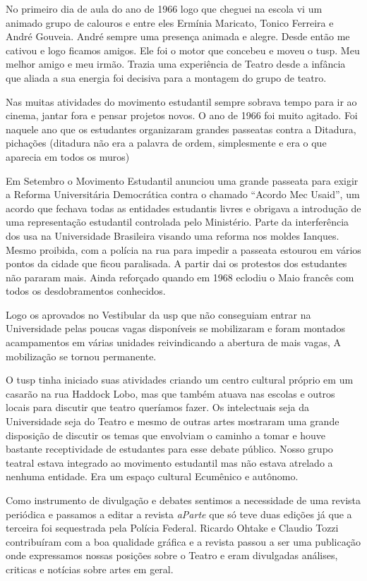 No primeiro dia de aula do ano de 1966 logo que cheguei na escola vi um
animado grupo de calouros e entre eles Ermínia Maricato, Tonico Ferreira
e André Gouveia. André sempre uma presença animada e alegre. Desde então
me cativou e logo ficamos amigos. Ele foi o motor que concebeu e moveu o
{\sc tusp}. Meu melhor amigo e meu irmão. Trazia uma experiência de Teatro
desde a infância que aliada a sua energia foi decisiva para a montagem
do grupo de teatro.

Nas muitas atividades do movimento estudantil sempre sobrava tempo para
ir ao cinema, jantar fora e pensar projetos novos. O ano de 1966 foi
muito agitado. Foi naquele ano que os estudantes organizaram grandes
passeatas contra a Ditadura, pichações ({\sc ditadura não} era a palavra de
ordem, simplesmente e era o que aparecia em todos os muros)

Em Setembro o Movimento Estudantil anunciou uma grande passeata para
exigir a Reforma Universitária Democrática contra o chamado “Acordo Mec
Usaid”, um acordo que fechava todas as entidades estudantis livres e
obrigava a introdução de uma representação estudantil controlada pelo
Ministério. Parte da interferência dos {\sc usa} na Universidade Brasileira
visando uma reforma nos moldes Ianques. Mesmo proibida, com a polícia na
rua para impedir a passeata estourou em vários pontos da cidade que
ficou paralisada. A partir dai os protestos dos estudantes não pararam
mais. Ainda reforçado quando em 1968 eclodiu o Maio francês com todos os
desdobramentos conhecidos.

Logo os aprovados no Vestibular da {\sc usp} que não conseguiam entrar na
Universidade pelas poucas vagas disponíveis se mobilizaram e foram
montados acampamentos em várias unidades reivindicando a abertura de
mais vagas, A mobilização se tornou permanente.

O {\sc tusp} tinha iniciado suas atividades criando um centro cultural próprio
em um casarão na rua Haddock Lobo, mas que também atuava nas escolas e
outros locais para discutir que teatro queríamos fazer. Os intelectuais
seja da Universidade seja do Teatro e mesmo de outras artes mostraram
uma grande disposição de discutir os temas que envolviam o caminho a
tomar e houve bastante receptividade de estudantes para esse debate
público. Nosso grupo teatral estava integrado ao movimento estudantil
mas não estava atrelado a nenhuma entidade. Era um espaço cultural
Ecumênico e autônomo.

Como instrumento de divulgação e debates sentimos a necessidade de uma
revista periódica e passamos a editar a revista {\it aParte} que só teve
duas edições já que a terceira foi sequestrada pela Polícia Federal.
Ricardo Ohtake e Claudio Tozzi contribuíram com a boa qualidade gráfica
e a revista passou a ser uma publicação onde expressamos nossas posições
sobre o Teatro e eram divulgadas análises, criticas e notícias sobre
artes em geral.

